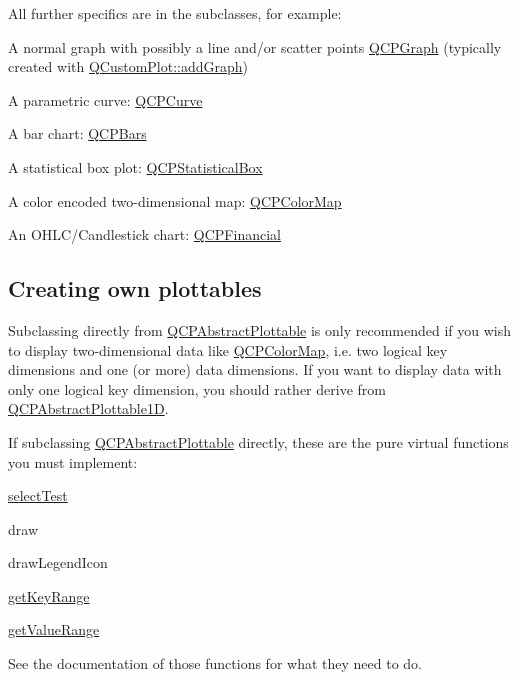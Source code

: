 All further specifics are in the subclasses, for example\+: \begin{DoxyItemize}
\item A normal graph with possibly a line and/or scatter points \hyperlink{class_q_c_p_graph}{Q\+C\+P\+Graph} (typically created with \hyperlink{class_q_custom_plot_a6fb2873d35a8a8089842d81a70a54167}{Q\+Custom\+Plot\+::add\+Graph}) \item A parametric curve\+: \hyperlink{class_q_c_p_curve}{Q\+C\+P\+Curve} \item A bar chart\+: \hyperlink{class_q_c_p_bars}{Q\+C\+P\+Bars} \item A statistical box plot\+: \hyperlink{class_q_c_p_statistical_box}{Q\+C\+P\+Statistical\+Box} \item A color encoded two-\/dimensional map\+: \hyperlink{class_q_c_p_color_map}{Q\+C\+P\+Color\+Map} \item An O\+H\+L\+C/\+Candlestick chart\+: \hyperlink{class_q_c_p_financial}{Q\+C\+P\+Financial}\end{DoxyItemize}
\hypertarget{class_q_c_p_abstract_plottable_plottables-subclassing}{}\subsection{Creating own plottables}\label{class_q_c_p_abstract_plottable_plottables-subclassing}
Subclassing directly from \hyperlink{class_q_c_p_abstract_plottable}{Q\+C\+P\+Abstract\+Plottable} is only recommended if you wish to display two-\/dimensional data like \hyperlink{class_q_c_p_color_map}{Q\+C\+P\+Color\+Map}, i.\+e. two logical key dimensions and one (or more) data dimensions. If you want to display data with only one logical key dimension, you should rather derive from \hyperlink{class_q_c_p_abstract_plottable1_d}{Q\+C\+P\+Abstract\+Plottable1D}.

If subclassing \hyperlink{class_q_c_p_abstract_plottable}{Q\+C\+P\+Abstract\+Plottable} directly, these are the pure virtual functions you must implement\+: \begin{DoxyItemize}
\item \hyperlink{class_q_c_p_abstract_plottable_a38efe9641d972992a3d44204bc80ec1d}{select\+Test} \item draw \item draw\+Legend\+Icon \item \hyperlink{class_q_c_p_abstract_plottable_a4da16d3cd4b509e1104a9b0275623c96}{get\+Key\+Range} \item \hyperlink{class_q_c_p_abstract_plottable_a4de773988b21ed090fddd27c6a3a3dcb}{get\+Value\+Range}\end{DoxyItemize}
See the documentation of those functions for what they need to do.

